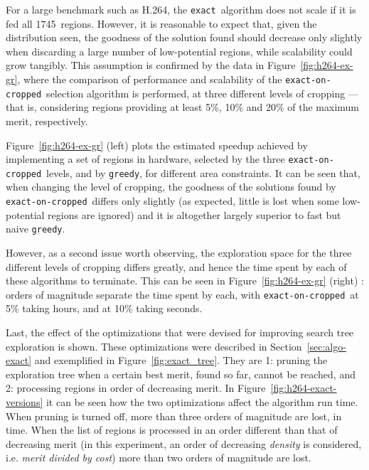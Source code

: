 \documentclass[]{usiinfthesis}
\newcommand{\htsf}{{H.264}}
\newcommand{\exact}{\texttt{exact}}
\newcommand{\greedy}{\texttt{greedy}}
\newcommand{\exactC}{\texttt{exact-on-cropped}}
\newcommand{\numofhtsfregs}{1745} %
\begin{document}
For a large benchmark such as \htsf, the \exact\ algorithm does not
scale if it is fed all \numofhtsfregs\ regions. However, it is reasonable
to expect that, given the distribution seen, the goodness of the
solution found should decrease only slightly when discarding a large
number of low-potential regions, while scalability
could grow tangibly.
This assumption is confirmed by the data in
Figure~\ref{fig:h264-ex-gr}, where the comparison of performance and
scalability of the \exactC\ selection algorithm is performed, at three different
levels of cropping --- that is, considering regions providing at
least 5\%, 10\% and 20\% of the maximum merit, respectively.\par

Figure~\ref{fig:h264-ex-gr} (left) plots the estimated speedup achieved by
implementing a set of regions in hardware, selected by the three \exactC\
levels, and by \greedy, for different area constraints. It can be seen
that, when changing the level of cropping, the goodness of the
solutions found by \exactC\ differs only slightly (as expected, little
is lost when some low-potential regions are ignored) and it is
altogether largely superior to fast but naive \greedy.\par

However, as a second issue worth observing, the exploration space for
the three different levels of cropping differs greatly, and hence the
time spent by each of these algorithms to terminate. This can be seen
in Figure~\ref{fig:h264-ex-gr} (right) : orders of magnitude separate
the time spent by each, with \exactC\ at 5\% taking hours, and at 10\%
taking seconds.\par

Last, the effect of the optimizations that were devised for
improving search tree exploration is shown. These optimizations were 
described in Section~\ref{sec:algo-exact} and exemplified in
Figure~\ref{fig:exact_tree}. They are 1: pruning the
exploration tree when a certain best merit, found so far, cannot be
reached, and 2: processing regions in order of decreasing merit. In
Figure~\ref{fig:h264-exact-versions} it can be seen how the two
optimizations affect the algorithm run time. When pruning is turned
off, more than three orders of magnitude are lost, in time. When the
list of regions is processed in an order different than that of
decreasing merit (in this experiment, an order of decreasing
\emph{density} is considered, i.e. \emph{merit divided by cost}) more
than two orders of magnitude are lost.
\end{document}
